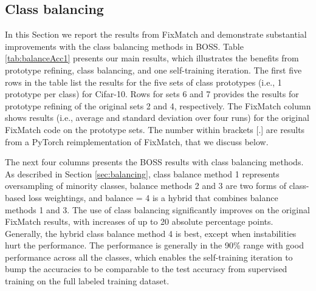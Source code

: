 \documentclass[final]{cvpr}
\begin{document}
\begin{table*}
\begin{center}
\begin{tabular}{|c|c|c|c|c|c|c|c|c|c|}
		\end{tabular}
	\end{center}
	\caption{ \textbf{Main results.}  BOSS methods are compared using five sets of class prototypes (i.e., 1 prototype per class) for Cifar-10, plus two sets from prototype refining.  The FixMatch column shows test accuracies (average and standard deviation of 4 runs) for the original FixMatch code on the prototype sets.  The next four columns gives the accuracy results for the class balance methods (see text for a description of class balance methods).  Results for the PyTorch reimplementation of FixMatch and modified with the BOSS methods are shown in brackets [.].  The self-training iteration was performed with the top pseudo-labels from the run shown in bold and the results are in the next four columns. 
}
	\label{tab:balanceAcc1}
\end{table*}




\subsection{Class balancing}
\label{sec:expBalancing}



In this Section we report the results from FixMatch and demonstrate substantial improvements with the class balancing methods in BOSS.
Table \ref{tab:balanceAcc1} presents our main results, which illustrates the benefits from prototype refining, class balancing, and one self-training iteration.
The first five rows in the table list the results for the five sets of class prototypes (i.e., 1 prototype per class) for Cifar-10.
Rows for sets 6 and 7 provides the results for prototype refining of the original sets 2 and 4, respectively.  
The FixMatch column shows results (i.e., average and standard deviation over four runs) for the original FixMatch code on the prototype sets. 
The number within brackets [.] are results from a PyTorch reimplementation of FixMatch, that we discuss below.

The next four columns presents the BOSS results with class balancing methods.
As described in Section \ref{sec:balancing}, class balance method 1 represents oversampling of minority classes, balance methods 2 and 3 are two forms of class-based loss weightings, and balance = 4 is a  hybrid that combines balance methods 1 and 3.
The use of class balancing significantly improves on the original FixMatch results, with increases of up to 20 absolute percentage points.
Generally, the hybrid class balance method 4 is best, except when instabilities hurt the performance.
The performance is generally in the 90\% range with good performance across all the classes, which enables the self-training iteration to bump the accuracies to be comparable to the test accuracy from supervised training on the full labeled training dataset.
\end{document}
